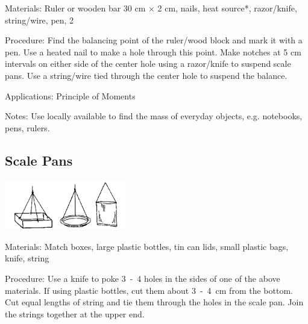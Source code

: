 \begin{multicols}{2}
\begin{description*}
\item[Materials:]{Ruler or wooden bar 30 cm $\times$ 2 cm, nails, heat source*, razor/knife, string/wire, pen, 2 }
\item[Procedure:]{Find the balancing point of the ruler/wood block and mark it with a pen. Use a heated nail to make a hole through this point. Make notches at 5 cm intervals on either side of the center hole using a razor/knife to suspend scale pans. Use a string/wire tied through the center hole to suspend the balance.}
\item[Applications:]{Principle of Moments}
\item[Notes:]{Use locally available  to find the mass of everyday objects, e.g. notebooks, pens, rulers.}
\end{description*}

\subsection{Scale Pans}
\label{sub:scalepans}

\begin{center}
\includegraphics[width=0.4\textwidth]{./img/source/scale-pans.png}
\end{center}

\begin{description*}
\item[Materials:]{Match boxes, large plastic bottles, tin can lids, small plastic bags, knife, string}
\item[Procedure:]{Use a knife to poke 3~-~4 holes in the sides of one of the above materials. If using plastic bottles, cut them about 3~-~4~cm from the bottom. Cut equal lengths of string and tie them through the holes in the scale pan. Join the strings together at the upper end. }
\end{description*}


\end{multicols}
